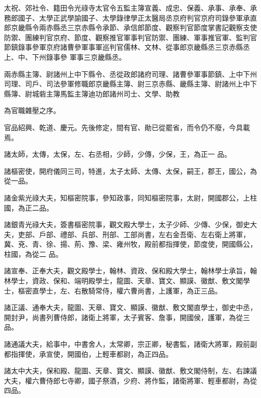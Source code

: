 \begin{pinyinscope}
 太祝、郊社令、籍田令光祿寺太官令五監主簿宣義、成忠、保義、承事、承奉、承務郎國子、太學正武學諭國子、太學錄律學正太醫局丞京府判官京府司錄參軍承直郎京畿縣令兩赤縣丞三京赤縣令承節、承信郎節度、觀察判官節度掌書記觀察支使防禦、團練判官京府、節度、觀察推官軍事判官防禦、團練、軍事推官軍、監判官節鎮錄事參軍京府諸曹參軍事軍巡判官儒林、文林、從事郎京畿縣丞三京赤縣丞上、中、下州錄事參
 軍事三京畿縣丞。



 兩赤縣主簿、尉諸州上中下縣令、丞從政郎諸府司理、諸曹參軍事節鎮、上中下州司理、司戶、司法參軍修職郎京畿縣主簿、尉三京赤縣、畿縣主簿、尉諸州上中下縣簿、尉城砦主簿馬監主簿迪功郎諸州司士、文學、助教



 為官職雜壓之序。



 官品紹興、乾道、慶元。先後修定，間有官、勛已從罷省，而令仍不廢，今具載焉。



 諸太師，太傳，太保，左、右丞相，少師，少傳，少保，王，為正一
 品。



 諸樞密使，開府儀同三司，特進，太子太師、太傳、太保，嗣王，郡王，國公，為從一品。



 諸金紫光祿大夫，知樞密院事，參知政事，同知樞密院事，太尉，開國郡公，上柱國，為正二品。



 諸銀青光祿大夫，簽書樞密院事，觀文殿大學士，太子少師、少傳、少保，御史大夫，吏部、戶部、禮部、兵部、刑部、工部尚書，左右金吾衛、左右衛上將軍，冀、兗、青、徐、揚、荊、豫、梁、雍州牧，殿前都指揮使，節度使，開國縣公，柱國，為從二
 品。



 諸宣奉、正奉大夫，觀文殿學士，翰林、資政、保和殿大學士，翰林學士承旨，翰林學士，資政、保和、端明殿學士，龍圖、天章、寶文、顯謨、徽猷、敷文閣學士，樞密直學士，左、右散騎常侍，權六曹尚書，上護軍，為正三品。



 諸正議、通奉大夫，龍圖、天章、寶文、顯謨、徽猷、敷文閣直學士，御史中丞，開封尹，尚書列曹侍郎，諸衛上將軍，太子賓客、詹事，開國侯，護軍，為從三品。



 諸通議大夫，給事中，中書舍人，太常卿，宗正卿，秘書監，諸衛大將軍，殿前副都指揮使，承宣使，開國伯，上輕車都尉，為正四品。



 諸太中大夫，保和殿、龍圖、天章、寶文、顯謨、徽猷、敷文閣侍制，左、右諫議大夫，權六曹侍郎七寺卿，國子祭酒，少府、將作監，諸衛將軍、輕車都尉，為從四品。




\end{pinyinscope}
